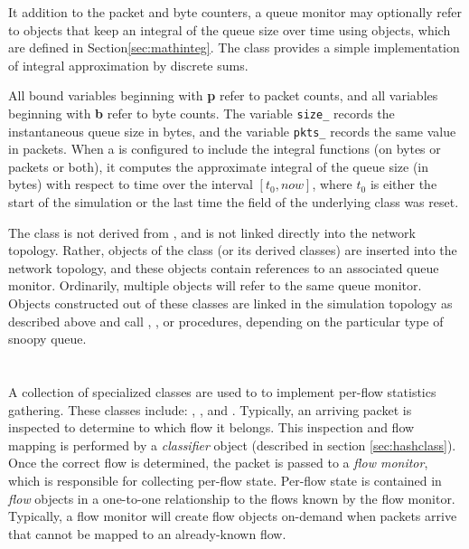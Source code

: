 It addition to the packet and byte counters, a queue monitor
may optionally refer to objects that keep an integral
of the queue size over time using
 objects, which are defined in Section\ref{sec:mathinteg}.
The  class provides a simple implementation of
integral approximation by discrete sums.

All bound variables beginning with {\bf p} refer to packet counts, and
all variables beginning with {\bf b} refer to byte counts.
The variable {\tt size\_} records the instantaneous queue size in bytes,
and the variable {\tt pkts\_} records the same value in packets.
When a  is configured to include the integral
functions (on bytes or packets or both), it
computes the approximate integral of the
queue size (in bytes)
with respect to time over the interval $[t_0, now]$, where
$t_0$ is either the start of the simulation or the last time the
 field of the underlying  class was reset.

The  class is not derived from , and
is not linked directly into the network topology.
Rather, objects of the  class (or its derived classes)
are inserted into the network topology, and these objects contain references
to an associated queue monitor.
Ordinarily, multiple  objects will refer to the same
queue monitor.
Objects constructed out of these classes are linked in the simulation
topology as described above and call 
, , or  procedures,
depending on the particular type of snoopy queue.

\section{}

A collection of specialized classes are used to to implement
per-flow statistics gathering.
These classes include: ,
, and .
Typically, an arriving packet is inspected to determine
to which flow it belongs.
This inspection and flow mapping is performed by a {\em classifier}
object (described in section \ref{sec:hashclass}).
Once the correct flow is determined, the packet is passed to
a {\em flow monitor}, which is responsible for collecting per-flow
state.
Per-flow state is contained in {\em flow} objects in a one-to-one
relationship to the flows known by the flow monitor.
Typically, a flow monitor will create flow objects on-demand when
packets arrive that cannot be mapped to an already-known flow.

